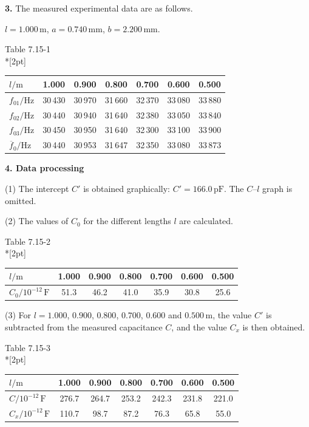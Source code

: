 \textbf{3.} The measured experimental data are as follows.

$l=1.000\,\mathrm{m}$, $a=0.740\,\mathrm{mm}$, $b=2.200\,\mathrm{mm}$.

\begin{center}
{\small Table 7.15-1}\\*[2pt]
\begin{tabular}{lcccccc}
\toprule
$l/\mathrm{m}$ & 1.000 & 0.900 & 0.800 & 0.700 & 0.600 & 0.500\\
\midrule
$f_{01}/\mathrm{Hz}$ & 30\,430 & 30\,970 & 31\,660 & 32\,370 & 33\,080 & 33\,880\\
$f_{02}/\mathrm{Hz}$ & 30\,440 & 30\,940 & 31\,640 & 32\,380 & 33\,050 & 33\,840\\
$f_{03}/\mathrm{Hz}$ & 30\,450 & 30\,950 & 31\,640 & 32\,300 & 33\,100 & 33\,900\\
\midrule
$\overline{f}_0/\mathrm{Hz}$ & 30\,440 & 30\,953 & 31\,647 & 32\,350 & 33\,080 & 33\,873\\
\bottomrule
\end{tabular}
\end{center}

\textbf{4. Data processing}

(1) The intercept $C'$ is obtained graphically: $C'=166.0\,\mathrm{pF}$. The $C$--$l$ graph is omitted.

(2) The values of $C_0$ for the different lengths $l$ are calculated.

\begin{center}
{\small Table 7.15-2}\\*[2pt]
\begin{tabular}{lcccccc}
\toprule
$l/\mathrm{m}$ & 1.000 & 0.900 & 0.800 & 0.700 & 0.600 & 0.500\\
\midrule
$C_0/10^{-12}\,\mathrm{F}$ & 51.3 & 46.2 & 41.0 & 35.9 & 30.8 & 25.6\\
\bottomrule
\end{tabular}
\end{center}

(3) For $l=1.000$, $0.900$, $0.800$, $0.700$, $0.600$ and $0.500\,\mathrm{m}$, the value $C'$ is subtracted from the measured capacitance $C$, and the value $C_x$ is then obtained.

\begin{center}
{\small Table 7.15-3}\\*[2pt]
\begin{tabular}{lcccccc}
\toprule
$l/\mathrm{m}$ & 1.000 & 0.900 & 0.800 & 0.700 & 0.600 & 0.500\\
\midrule
$C/10^{-12}\,\mathrm{F}$ & 276.7 & 264.7 & 253.2 & 242.3 & 231.8 & 221.0\\
$C_x/10^{-12}\,\mathrm{F}$ & 110.7 & 98.7 & 87.2 & 76.3 & 65.8 & 55.0\\
\bottomrule
\end{tabular}
\end{center}

